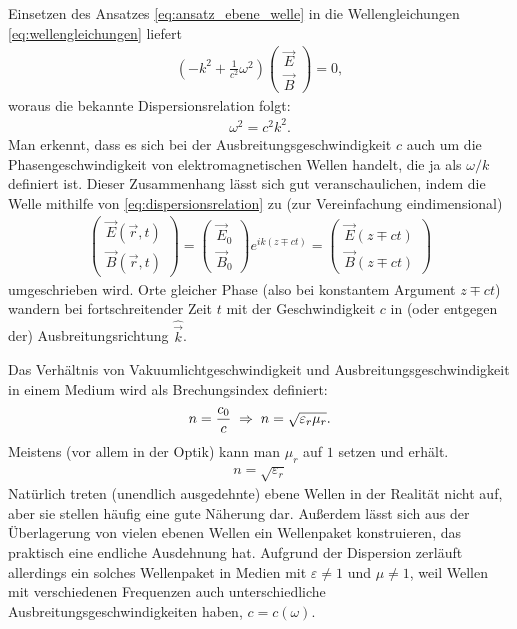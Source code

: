 Einsetzen des Ansatzes \eqref{eq:ansatz_ebene_welle} in die Wellengleichungen \eqref{eq:wellengleichungen} liefert
\begin{align*}
    \left(-k^2+\frac{1}{c^2}\omega^2\right) \begin{pmatrix} \vec E \\ \vec B \end{pmatrix} = 0,
\end{align*}
woraus die bekannte Dispersionsrelation folgt:
\begin{align}
    \label{eq:dispersionsrelation}
    \omega^2 = c^2k^2.
\end{align}
Man erkennt, dass es sich bei der Ausbreitungsgeschwindigkeit $c$ auch um die Phasengeschwindigkeit von elektromagnetischen Wellen handelt, die ja als $\omega/k$ definiert ist.
Dieser Zusammenhang lässt sich gut veranschaulichen, indem die Welle mithilfe von \eqref{eq:dispersionsrelation} zu (zur Vereinfachung eindimensional)
\begin{align*}
    \begin{pmatrix}
        \vec E(\vec r,t) \\
        \vec B(\vec r,t)
    \end{pmatrix}
    =
    \begin{pmatrix}
        \vec E_0 \\
        \vec B_0
    \end{pmatrix}
    e^{ik(z \mp ct)} =
    \begin{pmatrix}
        \vec E(z\mp ct) \\
        \vec B(z\mp ct)
    \end{pmatrix}
\end{align*}
umgeschrieben wird. Orte gleicher Phase (also bei konstantem Argument $z\mp ct$) wandern bei fortschreitender Zeit $t$ mit der Geschwindigkeit $c$ in (oder entgegen der) Ausbreitungsrichtung $\hat{\vec k}$.


Das Verhältnis von Vakuumlichtgeschwindigkeit und Ausbreitungsgeschwindigkeit in einem Medium wird als Brechungsindex definiert:
\begin{align}
    \label{eq:definition_brechungsindex}
    n=\frac{c_0}{c} \;\Rightarrow\; n=\sqrt{\varepsilon_r\mu_r}.
\end{align}
Meistens (vor allem in der Optik) kann man $\mu_r$ auf $1$ setzen und erhält.
\begin{align*}
    n = \sqrt{\varepsilon_r}
\end{align*}
Natürlich treten (unendlich ausgedehnte) ebene Wellen in der Realität nicht auf, aber sie stellen häufig eine gute Näherung dar.
Außerdem lässt sich aus der Überlagerung von vielen ebenen Wellen ein Wellenpaket konstruieren, das praktisch eine endliche Ausdehnung hat.
Aufgrund der Dispersion zerläuft allerdings ein solches Wellenpaket in Medien mit $\varepsilon\neq 1$ und $\mu\neq 1$, weil Wellen mit verschiedenen Frequenzen auch unterschiedliche Ausbreitungsgeschwindigkeiten haben, $c=c(\omega)$.

